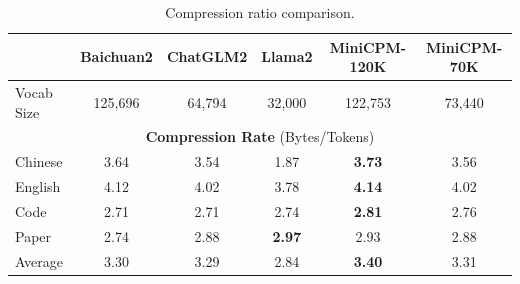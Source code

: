 \begin{table}[htbp]
\centering
\begin{tabular}{lccccc}
\toprule
  & {\textbf{Baichuan2}}  & {\textbf{ChatGLM2}} & {\textbf{Llama2}} & {\textbf{MiniCPM-120K}}  & {\textbf{MiniCPM-70K}}\\
\midrule
Vocab Size & 125,696 & 64,794 & 32,000 & 122,753 & 73,440\\
\midrule
\multicolumn{6}{c}{\textbf{Compression Rate} (Bytes/Tokens) }\\
\midrule
Chinese & 3.64   & 3.54  & 1.87  & \textbf{3.73} &  3.56 \\
English & 4.12   & 4.02  & 3.78  & \textbf{4.14} & 4.02 \\
Code    & 2.71   & 2.71  & 2.74  & \textbf{2.81} & 2.76 \\
Paper   & 2.74   & 2.88  & \textbf{2.97}  & 2.93 & 2.88\\
\midrule
Average & 3.30   & 3.29  & 2.84  & \textbf{3.40}  & 3.31 \\
\bottomrule
\end{tabular}
\caption{Compression ratio comparison.}
\label{tab:compression_ratio}
\end{table}